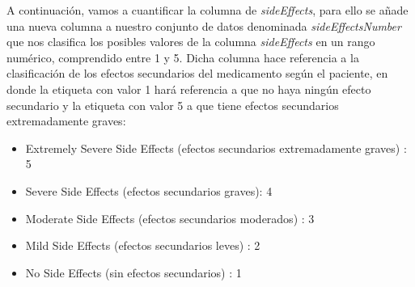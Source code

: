 \documentclass[spanish,]{article}
\providecommand{\tightlist}{%
  \setlength{\itemsep}{0pt}\setlength{\parskip}{0pt}}
\begin{document}
A continuación, vamos a cuantificar la columna de \emph{sideEffects},
para ello se añade una nueva columna a nuestro conjunto de datos
denominada \emph{sideEffectsNumber} que nos clasifica los posibles
valores de la columna \emph{sideEffects} en un rango numérico,
comprendido entre 1 y 5. Dicha columna hace referencia a la
clasificación de los efectos secundarios del medicamento según el
paciente, en donde la etiqueta con valor 1 hará referencia a que no haya
ningún efecto secundario y la etiqueta con valor 5 a que tiene efectos
secundarios extremadamente graves:

\begin{itemize}
\tightlist
\item
  Extremely Severe Side Effects (efectos secundarios extremadamente
  graves) : 5
\item
  Severe Side Effects (efectos secundarios graves): 4
\item
  Moderate Side Effects (efectos secundarios moderados) : 3
\item
  Mild Side Effects (efectos secundarios leves) : 2
\item
  No Side Effects (sin efectos secundarios) : 1
\end{itemize}
\end{document}
